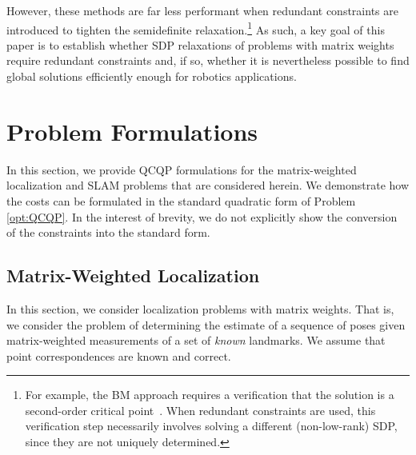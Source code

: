 \documentclass[lettersize,journal]{IEEEtran}
\begin{document}
However, these methods are far less performant when redundant constraints are introduced to tighten the semidefinite relaxation.\footnote{For example, the BM approach requires a verification that the solution is a second-order critical point~\cite{boumalDeterministicGuaranteesBurerMonteiro2020a}. When redundant constraints are used, this verification step necessarily involves solving a different (non-low-rank) SDP, since they are not uniquely determined.} As such, a key goal of this paper is to establish whether SDP relaxations of problems with matrix weights require redundant constraints and, if so, whether it is nevertheless possible to find global solutions efficiently enough for robotics applications.

\section{Problem Formulations}\label{sec:Formulations}

In this section, we provide QCQP formulations for the matrix-weighted localization and SLAM problems that are considered herein. We demonstrate how the costs can be formulated in the standard quadratic form of Problem \eqref{opt:QCQP}. In the interest of brevity, we do not explicitly show the conversion of the constraints into the standard form.

\subsection{Matrix-Weighted Localization}\label{sec:Localization}

In this section, we consider localization problems with matrix weights. That is, we consider the problem of determining the estimate of a sequence of poses given matrix-weighted measurements of a set of \emph{known} landmarks. We assume that point correspondences are known and correct. 
\end{document}
